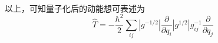 \begin{note}
\begin{equation}
\begin{aligned}
\end{aligned}\end{equation}
以上，可知量子化后的动能想可表述为
\begin{equation}
    \hat{T} = -\frac{\hbar^2}{2} \sum_{ij} |g^{-1/2}| \frac{\partial}{\partial q_i} |g^{1/2}| g^{-1}_{ij} \frac{\partial}{\partial q_{j}}
\end{equation}
\end{note}




